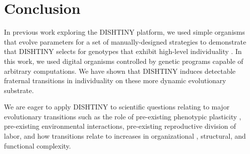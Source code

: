 \section{Conclusion}

In previous work exploring the DISHTINY platform, we used simple organisms that evolve parameters for a set of manually-designed strategies to demonstrate that DISHTINY selects for genotypes that exhibit high-level individuality \cite{moreno2018toward}.
In this work, we used digital organisms controlled by genetic programs capable of arbitrary computations.
We have shown that DISHTINY induces detectable fraternal transitions in individuality on these more dynamic evolutionary substrate.

%
%
%
We are eager to apply DISHTINY to scientific questions relating to major evolutionary transitions such as the role of pre-existing phenotypic plasticity \citep{clune2007investigating, lalejini2016evolutionary}, pre-existing environmental interactions, pre-existing reproductive division of labor, and how transitions relate to increases in organizational \citep{goldsby2012task}, structural, and functional \citep{goldsby2014evolutionary} complexity.

